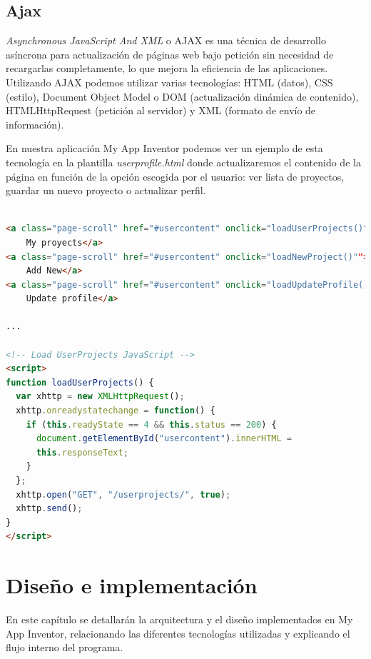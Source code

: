 \documentclass[a4paper, 12pt]{book}
\begin{document}
\section{Ajax} 
\label{sec:seccion10}
\textit{Asynchronous JavaScript And XML} o AJAX es una técnica de desarrollo asíncrona para actualización de páginas web bajo petición sin necesidad de recargarlas completamente, lo que mejora la eficiencia de las aplicaciones. Utilizando AJAX podemos utilizar varias tecnologías: HTML (datos), CSS (estilo), Document Object Model o DOM (actualización dinámica de contenido), HTMLHttpRequest (petición al servidor) y XML (formato de envío de información).

En nuestra aplicación My App Inventor podemos ver un ejemplo de esta tecnología en la plantilla \textit{userprofile.html} donde actualizaremos el contenido de la página en función de la opción escogida por el usuario: ver lista de proyectos, guardar un nuevo proyecto o actualizar perfil.
\vspace{5mm}
\begin{lstlisting}[language=HTML]

<a class="page-scroll" href="#usercontent" onclick="loadUserProjects()">
	My proyects</a>
<a class="page-scroll" href="#usercontent" onclick="loadNewProject()"">
	Add New</a>
<a class="page-scroll" href="#usercontent" onclick="loadUpdateProfile()">
	Update profile</a>

...

<!-- Load UserProjects JavaScript -->
<script>
function loadUserProjects() {
  var xhttp = new XMLHttpRequest();
  xhttp.onreadystatechange = function() {
    if (this.readyState == 4 && this.status == 200) {
      document.getElementById("usercontent").innerHTML =
      this.responseText;
    }
  };
  xhttp.open("GET", "/userprojects/", true);
  xhttp.send();
}
</script>
\end{lstlisting}


\cleardoublepage
\chapter{Diseño e implementación}
En este capítulo se detallarán la arquitectura y el diseño implementados en My App Inventor, relacionando las diferentes tecnologías utilizadas y explicando el flujo interno del programa.  
\end{document}
